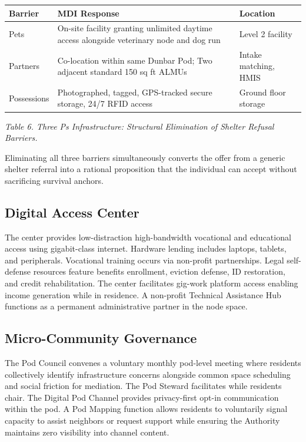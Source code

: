 \documentclass[12pt, letterpaper]{article}
\begin{document}
{\singlespacing
\begin{tabularx}{\textwidth}{@{}lXl@{}}
\toprule
\rowcolor{rowgray}
Barrier & MDI Response & Location \\
\midrule
Pets & On-site facility granting unlimited daytime access alongside veterinary node and dog run & Level 2 facility \\
\rowcolor{rowgray}
Partners & Co-location within same Dunbar Pod; Two adjacent standard 150 sq ft ALMUs & Intake matching, HMIS \\
Possessions & Photographed, tagged, GPS-tracked secure storage, 24/7 RFID access & Ground floor storage \\
\bottomrule
\end{tabularx}\par
\vspace{8pt}
\noindent\textit{Table 6. Three Ps Infrastructure: Structural Elimination of Shelter Refusal Barriers.}
\par}
Eliminating all three barriers simultaneously converts the offer from a generic shelter referral into a rational proposition that the individual can accept without sacrificing survival anchors.

\subsection{Digital Access Center}

The center provides low-distraction high-bandwidth vocational and educational access using gigabit-class internet. Hardware lending includes laptops, tablets, and peripherals. Vocational training occurs via non-profit partnerships. Legal self-defense resources feature benefits enrollment, eviction defense, ID restoration, and credit rehabilitation. The center facilitates gig-work platform access enabling income generation while in residence. A non-profit Technical Assistance Hub functions as a permanent administrative partner in the node space.

\subsection{Micro-Community Governance}

The Pod Council convenes a voluntary monthly pod-level meeting where residents collectively identify infrastructure concerns alongside common space scheduling and social friction for mediation. The Pod Steward facilitates while residents chair. The Digital Pod Channel provides privacy-first opt-in communication within the pod. A Pod Mapping function allows residents to voluntarily signal capacity to assist neighbors or request support while ensuring the Authority maintains zero visibility into channel content.
\end{document}
